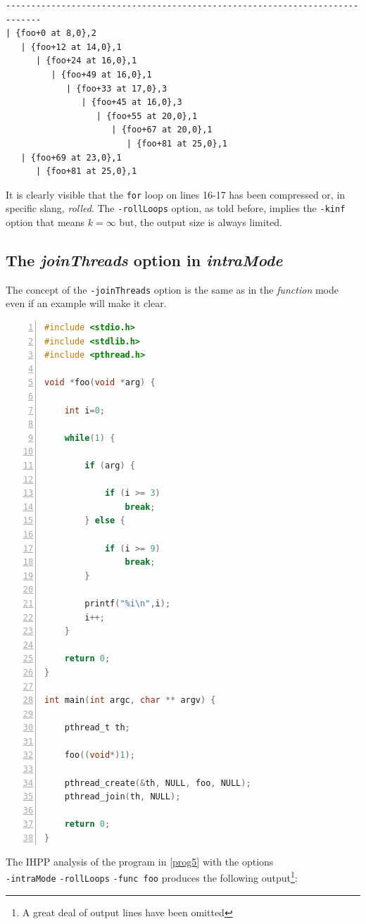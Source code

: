 \documentclass[a4paper,10pt]{report}
\begin{document}
\begin{lstlisting}[label=out10, caption={an output of IHPP with rollLoops option}]
-----------------------------------------------------------------------------
| {foo+0 at 8,0},2
   | {foo+12 at 14,0},1
      | {foo+24 at 16,0},1
         | {foo+49 at 16,0},1
            | {foo+33 at 17,0},3
               | {foo+45 at 16,0},3
                  | {foo+55 at 20,0},1
                     | {foo+67 at 20,0},1
                        | {foo+81 at 25,0},1
   | {foo+69 at 23,0},1
      | {foo+81 at 25,0},1
\end{lstlisting}

It is clearly visible that the \verb|for| loop on lines 16-17 
has been compressed or, in specific slang, \emph{rolled}.
The \verb|-rollLoops| option, as told before, implies the \verb|-kinf| option
that means $k=\infty$ but, the output size is always limited.

\subsection{The \emph{joinThreads} option in \emph{intraMode}}

The concept of the \verb|-joinThreads| option is the same as in the 
\emph{function} mode even if an example will make it clear. 

\begin{lstlisting}[language=C, 
	caption={prog5.c, an example program}, label=prog5, frame=leftline, numbers=left]
#include <stdio.h>
#include <stdlib.h>
#include <pthread.h>

void *foo(void *arg) {

	int i=0;

	while(1) {

		if (arg) {
		
			if (i >= 3)
				break;	
		} else {

			if (i >= 9)
				break;
		}
		
		printf("%i\n",i);
		i++;
	}

	return 0;
}

int main(int argc, char ** argv) {

	pthread_t th;
	
	foo((void*)1);

	pthread_create(&th, NULL, foo, NULL);
	pthread_join(th, NULL);

	return 0;
}

\end{lstlisting}

\noindent
The IHPP analysis of the program in \cref{prog5} with the options\\\verb|-intraMode| \verb|-rollLoops| \verb|-func foo| produces the following output\footnote{A great deal of output lines have been omitted}:
\end{document}
